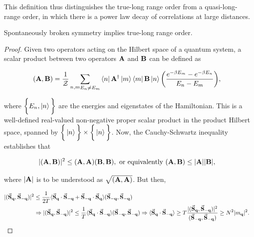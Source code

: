 \documentclass{homework}
\begin{document}
This definition thus distinguishes the true-long range order from a quasi-long-range order, in which there is a power law decay of correlations at large distances. 

\begin{tcolorbox}[colback=yellow!10!white,colframe=red!75!black,lowerbox=invisible, title = Spontaneously broken symmetry and true-long range order]

Spontaneously broken symmetry implies true-long range order.

\end{tcolorbox}

\begin{proof}
Given two operators acting on the Hilbert space of a quantum system, a scalar product between two operators ${\bf A}$ and ${\bf B}$ can be defined as 

$$
    ( {\bf A}, {\bf B} ) = \frac{1}{\mathcal{Z}} \sum_{\substack{{n,m}} \\
                    E_n \neq E_m} \bra{n}{{\bf A}}^\dagger \ket{m}
                    \bra{m} {{\bf B}} \ket{n} \bigg( \frac{e^{-\beta E_m} - e^{-\beta E_n}}{E_n - E_m} \bigg),
$$

where $\bigg\{E_n, \ket{n}\bigg\}$ are the energies and eigenstates of the Hamiltonian. This is a well-defined real-valued non-negative proper scalar product in the product Hilbert space, spanned by $\bigg\{\ket{n}\bigg\} \times \bigg\{\ket{n}\bigg\}$. Now, the Cauchy-Schwartz inequality establishes that 

$$
    |({\bf A}, {\bf B})|^2 \leq ({\bf A}, {\bf A}) ({\bf B}, {\bf B}), \textnormal{ or equivalently }
    ({\bf A}, {\bf B}) \leq |{\bf A}| |{\bf B}|,
$$

where $|{\bf A}|$ is to be understood as $\sqrt{({\bf A},{\bf A})}$. But then, 

\begin{equation}
    \begin{split}
        |(\vec{{\bf S}}_{{\bf q}}, \vec{{\bf S}}_{-{\bf q}})|^2 &\leq \frac{1}{2T} \langle \vec{{\bf S}}_{{\bf q}} \cdot  \vec{{\bf S}}_{-{\bf q}} + \vec{{\bf S}}_{-{\bf q}} \cdot  \vec{{\bf S}}_{{\bf q}} \rangle (\vec{{\bf S}}_{-{\bf q}}, \vec{{\bf S}}_{-{\bf q}}) \\
        & \Rightarrow|(\vec{{\bf S}}_{{\bf q}}, \vec{{\bf S}}_{-{\bf q}})|^2 \leq \frac{1}{T} \langle \vec{{\bf S}}_{{\bf q}} \cdot \vec{{\bf S}}_{-{\bf q}} \rangle (\vec{{\bf S}}_{-{\bf q}}, \vec{{\bf S}}_{-{\bf q}}) \Rightarrow \langle \vec{{\bf S}}_{{\bf q}} \cdot \vec{{\bf S}}_{-{\bf q}} \rangle \geq T \frac{|(\vec{{\bf S}}_{{\bf q}}, \vec{{\bf S}}_{-{\bf q}})|^2}{(\vec{{\bf S}}_{-{\bf q}}, \vec{{\bf S}}_{-{\bf q}})} \geq N^2 |m_{\bf q}|^2. 
    \end{split}
\end{equation}


\end{proof}
\end{document}

